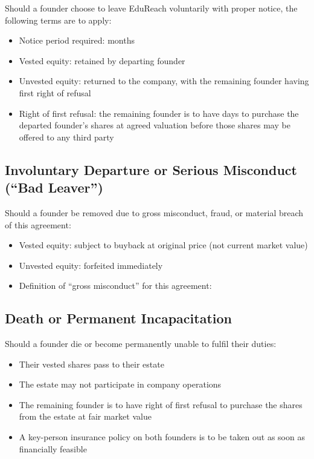 \documentclass[12pt,a4paper]{article}
\newcommand{\blank}[1][5.5cm]{\underline{\hspace{#1}}}
\begin{document}
Should a founder choose to leave EduReach voluntarily with proper notice, the following terms are to apply:

\begin{itemize}
  \item Notice period required: \blank[2cm] months
  \item Vested equity: retained by departing founder
  \item Unvested equity: returned to the company, with the remaining founder having first right of refusal
  \item Right of first refusal: the remaining founder is to have \blank[1.5cm] days to purchase the departed founder's shares at agreed valuation before those shares may be offered to any third party
\end{itemize}

\subsection{Involuntary Departure or Serious Misconduct (``Bad Leaver'')}

Should a founder be removed due to gross misconduct, fraud, or material breach of this agreement:

\begin{itemize}
  \item Vested equity: subject to buyback at original price (not current market value)
  \item Unvested equity: forfeited immediately
  \item Definition of ``gross misconduct'' for this agreement: \blank[7cm]
\end{itemize}

\subsection{Death or Permanent Incapacitation}

Should a founder die or become permanently unable to fulfil their duties:

\begin{itemize}
  \item Their vested shares pass to their estate
  \item The estate may not participate in company operations
  \item The remaining founder is to have right of first refusal to purchase the shares from the estate at fair market value
  \item A key-person insurance policy on both founders is to be taken out as soon as financially feasible
\end{itemize}
\end{document}
